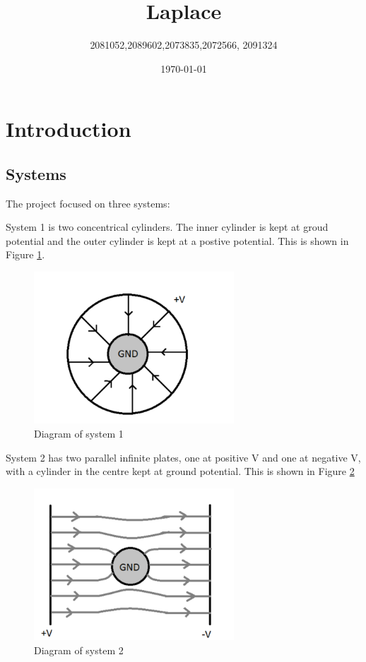 \documentclass{article}
\begin{document}
\title{Laplace}

\author{2081052,2089602,2073835,2072566, 2091324}


\date{\today}

\maketitle


\begin{abstract}

\end{abstract}


\section{Introduction}

\subsection{Systems}
The project focused on three systems:

System 1 is two concentrical cylinders. The inner cylinder is kept at groud potential and the outer cylinder is kept at a postive potential. This is shown in Figure  \ref{fig:System1}.

\begin{figure}[H]
\centering
\includegraphics[width=75mm]{System1.pdf}
\caption{Diagram of system 1}
\label{fig:System1}
\end{figure}

System 2 has two parallel infinite plates, one at positive V and one at negative V, with a cylinder in the centre kept at ground potential. This is shown in Figure \ref{fig:System2}
 
\begin{figure}[H]
\centering
\includegraphics[width=75mm]{System2.pdf}
\caption{Diagram of system 2}
\label{fig:System2}
\end{figure}
\end{document}
